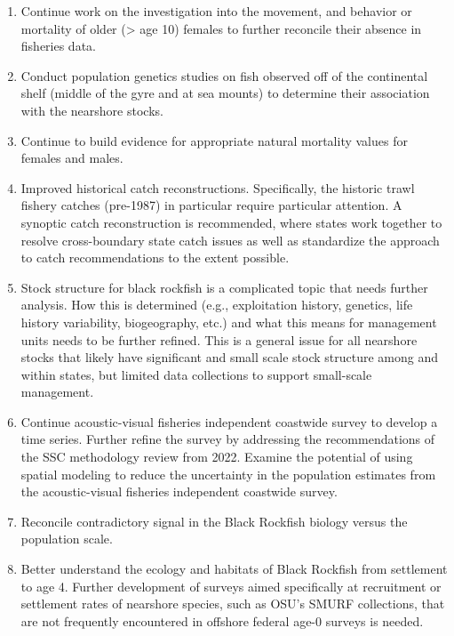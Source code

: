 \documentclass[11pt,
  english,
  letterpaper,
]{article}
\providecommand{\tightlist}{%
  \setlength{\itemsep}{0pt}\setlength{\parskip}{0pt}}
\providecommand{\tightlist}{%
  \setlength{\itemsep}{0pt}\setlength{\parskip}{0pt}}
\begin{document}
\begin{enumerate}
\def\labelenumi{\arabic{enumi}.}
\tightlist
\item
  Continue work on the investigation into the movement, and behavior or mortality of older (\textgreater{} age 10) females to further reconcile their absence in fisheries data.
\item
  Conduct population genetics studies on fish observed off of the continental shelf (middle of the gyre and at sea mounts) to determine their association with the nearshore stocks.
\item
  Continue to build evidence for appropriate natural mortality values for females and males.
\item
  Improved historical catch reconstructions. Specifically, the historic trawl fishery catches (pre-1987) in particular require particular attention. A synoptic catch reconstruction is recommended, where states work together to resolve cross-boundary state catch issues as well as standardize the approach to catch recommendations to the extent possible.
\item
  Stock structure for black rockfish is a complicated topic that needs further analysis. How this is determined (e.g., exploitation history, genetics, life history variability, biogeography, etc.) and what this means for management units needs to be further refined. This is a general issue for all nearshore stocks that likely have significant and small scale stock structure among and within states, but limited data collections to support small-scale management.
\item
  Continue acoustic-visual fisheries independent coastwide survey to develop a time series. Further refine the survey by addressing the recommendations of the SSC methodology review from 2022. Examine the potential of using spatial modeling to reduce the uncertainty in the population estimates from the acoustic-visual fisheries independent coastwide survey.
\item
  Reconcile contradictory signal in the Black Rockfish biology versus the population scale.
\item
  Better understand the ecology and habitats of Black Rockfish from settlement to age 4. Further development of surveys aimed specifically at recruitment or settlement rates of nearshore species, such as OSU's SMURF collections, that are not frequently encountered in offshore federal age-0 surveys is needed.
\end{enumerate}
\end{document}
